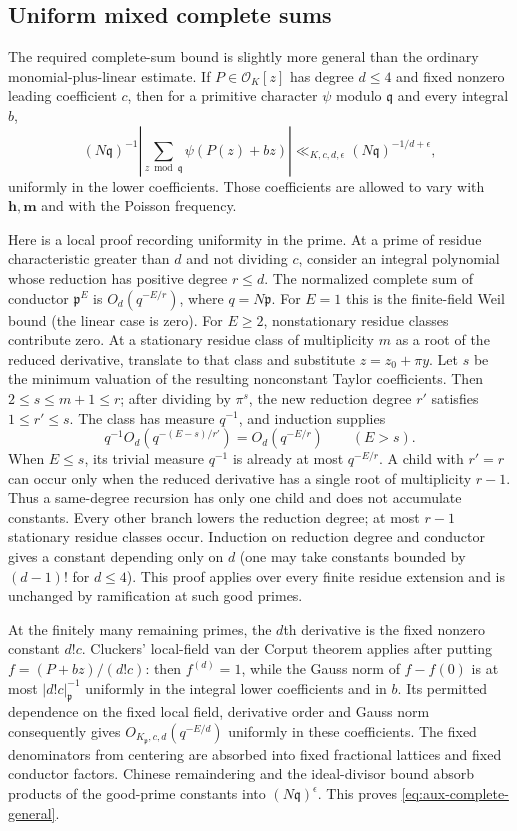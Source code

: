 \documentclass[11pt,reqno]{amsart}
\numberwithin{equation}{section}
\theoremstyle{definition}
\begin{document}
\subsection{Uniform mixed complete sums}

The required complete-sum bound is slightly more general than the ordinary
monomial-plus-linear estimate.  If $P\in\mathcal O_K[z]$ has degree
$d\le4$ and fixed nonzero leading coefficient $c$, then for a primitive
character $\psi$ modulo $\mathfrak q$ and every integral $b$,
\begin{equation}\label{eq:aux-complete-general}
 (N\mathfrak q)^{-1}
 \left|\sum_{z\bmod\mathfrak q}\psi(P(z)+bz)\right|
 \ll_{K,c,d,\epsilon}(N\mathfrak q)^{-1/d+\epsilon},
\end{equation}
uniformly in the lower coefficients.  Those coefficients are allowed to
vary with $\mathbf h,\mathbf m$ and with the Poisson frequency.

Here is a local proof recording uniformity in the prime.  At a prime of
residue characteristic greater than $d$ and not dividing $c$, consider
an integral polynomial whose reduction has positive degree $r\le d$.
The normalized complete sum of conductor $\mathfrak p^E$ is
$O_d(q^{-E/r})$, where $q=N\mathfrak p$.
For $E=1$ this is the finite-field Weil bound (the linear case is zero).
For $E\ge2$, nonstationary residue classes contribute zero.
At a stationary residue class of multiplicity $m$ as a root of the reduced
derivative, translate to that class and substitute $z=z_0+\pi y$.
Let $s$ be the minimum valuation of the resulting nonconstant Taylor
coefficients.  Then $2\le s\le m+1\le r$; after dividing by $\pi^s$,
the new reduction degree $r'$ satisfies $1\le r'\le s$.
The class has measure $q^{-1}$, and induction supplies
\[
 q^{-1}O_d(q^{-(E-s)/r'})=O_d(q^{-E/r})
 \qquad(E>s).
\]
When $E\le s$, its trivial measure $q^{-1}$ is already at most $q^{-E/r}$.
A child with $r'=r$ can occur only when the reduced derivative has a single
root of multiplicity $r-1$.  Thus a same-degree recursion has only one
child and does not accumulate constants.  Every other branch lowers the
reduction degree; at most $r-1$ stationary residue classes occur.
Induction on reduction degree and conductor gives a constant depending
only on $d$ (one may take constants bounded by $(d-1)!$ for $d\le4$).
This proof applies over every finite residue extension and is unchanged
by ramification at such good primes.

At the finitely many remaining primes, the $d$th derivative is the fixed
nonzero constant $d!c$.  Cluckers' local-field van der Corput theorem
\cite[Proposition~3.3]{Cluckers2011} applies after putting
$f=(P+bz)/(d!c)$: then $f^{(d)}=1$, while the Gauss norm of
$f-f(0)$ is at most $|d!c|_\mathfrak p^{-1}$ uniformly in the integral
lower coefficients and in $b$.  Its permitted dependence on the fixed
local field, derivative order and Gauss norm consequently gives
$O_{K_\mathfrak p,c,d}(q^{-E/d})$ uniformly in these coefficients.
The fixed denominators from centering are absorbed into fixed fractional
lattices and fixed conductor factors.  Chinese remaindering and the
ideal-divisor bound absorb
products of the good-prime constants into $(N\mathfrak q)^\epsilon$.
This proves \eqref{eq:aux-complete-general}.
\end{document}
